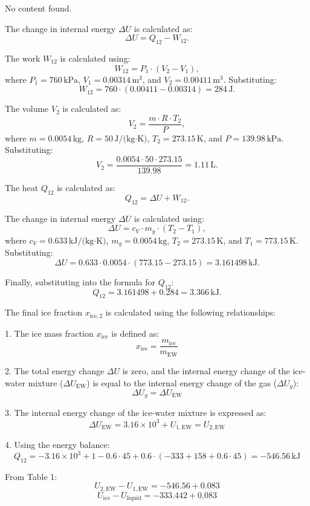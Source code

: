 No content found.

The change in internal energy \( \Delta U \) is calculated as:  
\[
\Delta U = Q_{12} - W_{12}.
\]  

The work \( W_{12} \) is calculated using:  
\[
W_{12} = P_1 \cdot (V_2 - V_1),
\]  
where \( P_1 = 760 \, \text{kPa} \), \( V_1 = 0.00314 \, \text{m}^3 \), and \( V_2 = 0.00411 \, \text{m}^3 \). Substituting:  
\[
W_{12} = 760 \cdot (0.00411 - 0.00314) = 284 \, \text{J}.
\]  

The volume \( V_2 \) is calculated as:  
\[
V_2 = \frac{m \cdot R \cdot T_2}{P},
\]  
where \( m = 0.0054 \, \text{kg} \), \( R = 50 \, \text{J/(kg·K)} \), \( T_2 = 273.15 \, \text{K} \), and \( P = 139.98 \, \text{kPa} \). Substituting:  
\[
V_2 = \frac{0.0054 \cdot 50 \cdot 273.15}{139.98} = 1.11 \, \text{L}.
\]  

The heat \( Q_{12} \) is calculated as:  
\[
Q_{12} = \Delta U + W_{12}.
\]  

The change in internal energy \( \Delta U \) is calculated using:  
\[
\Delta U = c_V \cdot m_g \cdot (T_2 - T_1),
\]  
where \( c_V = 0.633 \, \text{kJ/(kg·K)} \), \( m_g = 0.0054 \, \text{kg} \), \( T_2 = 273.15 \, \text{K} \), and \( T_1 = 773.15 \, \text{K} \). Substituting:  
\[
\Delta U = 0.633 \cdot 0.0054 \cdot (773.15 - 273.15) = 3.161498 \, \text{kJ}.
\]  

Finally, substituting into the formula for \( Q_{12} \):  
\[
Q_{12} = 3.161498 + 0.284 = 3.366 \, \text{kJ}.
\]

The final ice fraction \( x_{\text{ice},2} \) is calculated using the following relationships:  

1. The ice mass fraction \( x_{\text{ice}} \) is defined as:  
\[
x_{\text{ice}} = \frac{m_{\text{ice}}}{m_{\text{EW}}}
\]  

2. The total energy change \( \Delta U \) is zero, and the internal energy change of the ice-water mixture (\( \Delta U_{\text{EW}} \)) is equal to the internal energy change of the gas (\( \Delta U_g \)):  
\[
\Delta U_g = \Delta U_{\text{EW}}
\]  

3. The internal energy change of the ice-water mixture is expressed as:  
\[
\Delta U_{\text{EW}} = 3.16 \times 10^3 + U_{1,\text{EW}} = U_{2,\text{EW}}
\]  

4. Using the energy balance:  
\[
Q_{12} = -3.16 \times 10^3 + 1 - 0.6 \cdot 45 + 0.6 \cdot (-333 + 158 + 0.6 \cdot 45) = -546.56 \, \text{kJ}
\]  

From Table 1:  
\[
U_{2,\text{EW}} - U_{1,\text{EW}} = -546.56 + 0.083
\]  
\[
U_{\text{ice}} - U_{\text{liquid}} = -333.442 + 0.083
\]  

